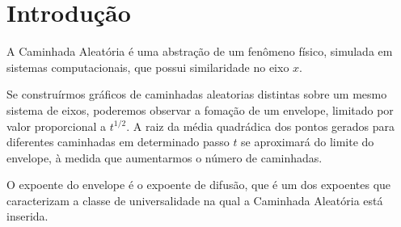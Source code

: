 
\section{Introdução}

A Caminhada Aleatória é uma abstração de um fenômeno físico, simulada em
sistemas computacionais, que possui similaridade no eixo $x$.

\vspace{5mm}
Se construírmos gráficos de caminhadas aleatorias distintas sobre um mesmo
sistema de eixos, poderemos observar a fomação de um envelope, limitado por
valor proporcional a $t^{1/2}$. A raiz da média quadrádica dos pontos gerados
para diferentes caminhadas em determinado passo $t$ se aproximará do limite do
envelope, à medida que aumentarmos o número de caminhadas.

\vspace{5mm}
O expoente do envelope é o expoente de difusão, que é um dos expoentes que
caracterizam a classe de universalidade na qual a Caminhada Aleatória está
inserida.
